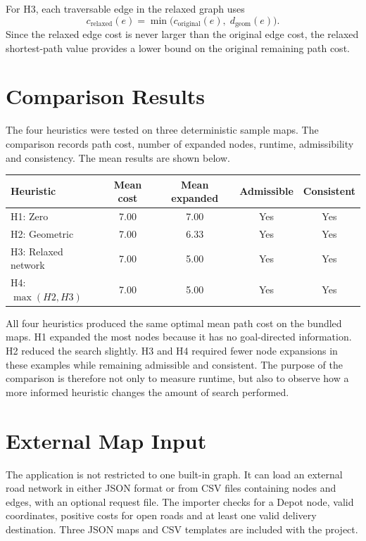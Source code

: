 \documentclass[11pt,a4paper]{article}
\begin{document}
For H3, each traversable edge in the relaxed graph uses
\[
    c_{\mathrm{relaxed}}(e)=\min\bigl(c_{\mathrm{original}}(e),\;d_{\mathrm{geom}}(e)\bigr).
\]
Since the relaxed edge cost is never larger than the original edge cost, the relaxed shortest-path value provides a lower bound on the original remaining path cost.

\section{Comparison Results}
The four heuristics were tested on three deterministic sample maps. The comparison records path cost, number of expanded nodes, runtime, admissibility and consistency. The mean results are shown below.

\begin{center}
\begin{tabular}{lcccc}
\toprule
\textbf{Heuristic} & \textbf{Mean cost} & \textbf{Mean expanded} & \textbf{Admissible} & \textbf{Consistent} \\
\midrule
H1: Zero & 7.00 & 7.00 & Yes & Yes \\
H2: Geometric & 7.00 & 6.33 & Yes & Yes \\
H3: Relaxed network & 7.00 & 5.00 & Yes & Yes \\
H4: $\max(H2,H3)$ & 7.00 & 5.00 & Yes & Yes \\
\bottomrule
\end{tabular}
\end{center}

All four heuristics produced the same optimal mean path cost on the bundled maps. H1 expanded the most nodes because it has no goal-directed information. H2 reduced the search slightly. H3 and H4 required fewer node expansions in these examples while remaining admissible and consistent. The purpose of the comparison is therefore not only to measure runtime, but also to observe how a more informed heuristic changes the amount of search performed.

\section{External Map Input}
The application is not restricted to one built-in graph. It can load an external road network in either JSON format or from CSV files containing nodes and edges, with an optional request file. The importer checks for a Depot node, valid coordinates, positive costs for open roads and at least one valid delivery destination. Three JSON maps and CSV templates are included with the project.
\end{document}

